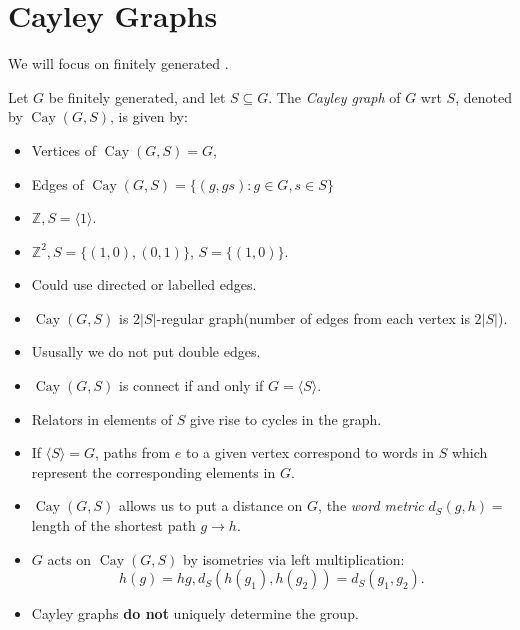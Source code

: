 \documentclass[10pt]{article}
\begin{document}
    \section{Cayley Graphs}
    We will focus on finitely generated .
    \begin{definition}
        Let $G$ be finitely generated, and let $ S \subseteq G $. The \textit{Cayley graph} of $G$ wrt $S$, denoted by $ \operatorname{Cay}(G,S)  $, is given by:
        \begin{itemize}
            \item Vertices of $ \operatorname{Cay}(G,S)=G  $,
            \item Edges of $ \operatorname{Cay}(G,S)=\{(g,gs):g\in G,s\in S\} $
        \end{itemize}
    \end{definition}
    \begin{example}
        \begin{itemize}
            \item $ \mathbb{Z}, S= \langle 1 \rangle $.
            \item $ \mathbb{Z}^2,S=\{(1,0),(0,1)\} $, $ S=\{(1,0)\} $.
        \end{itemize}
    \end{example}
    \begin{remark}
        \begin{itemize}
            \item Could use directed or labelled edges.
            \item $ \operatorname{Cay}(G,S)  $ is $ 2|S| $-regular graph(number of edges from each vertex is $ 2|S| $).
            \item Ususally we do not put double edges.
            \item $ \operatorname{Cay}(G,S)  $ is connect if and only if $ G=\langle S \rangle $.
            \item Relators in elements of $S$ give rise to cycles in the graph.
            \item If $ \langle S \rangle =G $, paths from $e$ to a given vertex correspond to words in $S$ which represent the corresponding elements in $G$.
            \item $ \operatorname{Cay}(G,S)  $ allows us to put a distance on $G$, the \textit{word metric} $ d_S(g,h) = $ length of the shortest path $ g\to h $.
            \item $G$ acts on $ \operatorname{Cay}(G,S)  $ by isometries via left multiplication: 
            \[
                h(g)=hg, d_S(h(g_1),h(g_2))=d_S(g_1,g_2) .
            \]
            \item Cayley graphs \textbf{do not} uniquely determine the group.
        \end{itemize}
    \end{remark}
\end{document}
